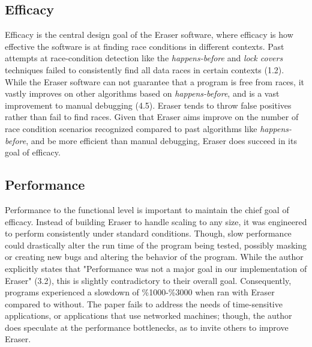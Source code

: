 \documentclass[11pt]{article}
\begin{document}
\subsection{Efficacy} %

Efficacy is the central design goal of the Eraser software, where efficacy is how effective the software is at finding race conditions in different contexts. Past attempts at race-condition detection like the \textit{happens-before} and \textit{lock covers} techniques failed to consistently find all data races in certain contexts (1.2). While the Eraser software can not guarantee that a program is free from races, it vastly improves on other algorithms based on \textit{happens-before}, and is a vast improvement to manual debugging (4.5). Eraser tends to throw false positives rather than fail to find races. Given that Eraser aims improve on the number of race condition scenarios recognized compared to past algorithms like \textit{happens-before}, and be more efficient than manual debugging, Eraser does succeed in its goal of efficacy.

\subsection{Performance} %
Performance to the functional level is important to maintain the chief goal of efficacy. Instead of building Eraser to handle scaling to any size, it was engineered to perform consistently under standard conditions. Though, slow performance could drastically alter the run time of the program being tested, possibly masking or creating new bugs and altering the behavior of the program. While the author explicitly states that "Performance was not a major goal in our implementation of Eraser" (3.2), this is slightly contradictory to their overall goal. Consequently, programs experienced a slowdown of \%1000-\%3000 when ran with Eraser compared to without. The paper fails to address the needs of time-sensitive applications, or applications that use networked machines; though, the author does speculate at the performance bottlenecks, as to invite others to improve Eraser.
\end{document}
